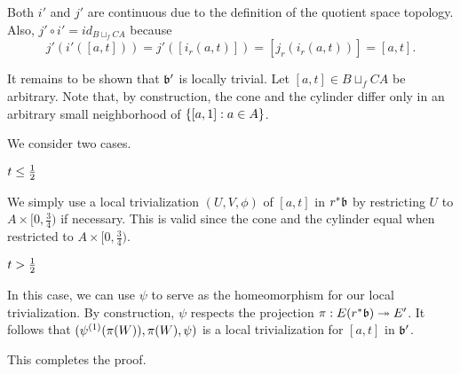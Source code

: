 \begin{myproof}
Both $i'$ and $j'$ are continuous due to the definition of the quotient space topology. Also, $j' \circ i' = id_{B \sqcup_f CA}$ because \[ j'(i'([a, t])) = j'([i_r(a, t)]) = [j_r(i_r(a, t))] = [a, t]. \]

It remains to be shown that $\bb'$ is locally trivial. Let $[a, t] \in B \sqcup_f CA$ be arbitrary. Note that, by construction, the cone and the cylinder differ only in an arbitrary small neighborhood of $\{[a, 1]:a \in A\}$.

We consider two cases. \begin{caselist} \item $t \le \frac{1}{2}$

We simply use a local trivialization $(U, V, \phi)$ of $[a, t]$ in $\ind{r}\bb$ by restricting $U$ to $A \times [0, \frac{3}{4})$ if necessary. This is valid since the cone and the cylinder equal when restricted to $A \times [0, \frac{3}{4})$.

\item $t > \frac{1}{2}$

In this case, we can use $\psi$ to serve as the homeomorphism for our local trivialization. By construction, $\psi$ respects the projection $\pi: E(\ind{r}\bb) \subm E'$. It follows that $(\psi^{(1)}(\pi(W)), \pi(W), \psi)$ is a local trivialization for $[a, t]$ in $\bb'$. \end{caselist} This completes the proof. \end{myproof}